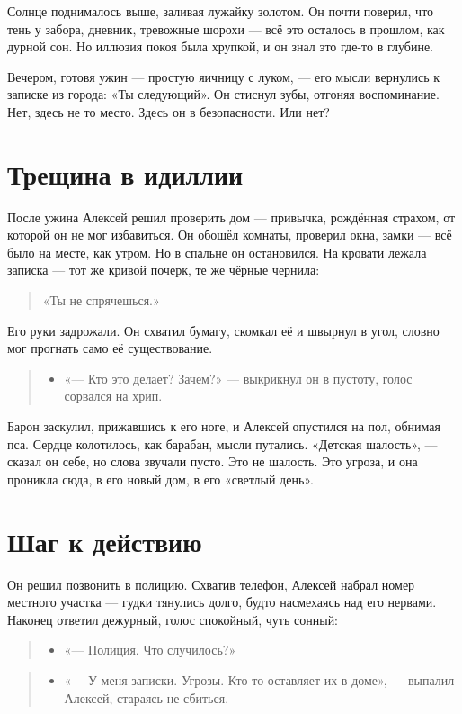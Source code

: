 \documentclass[12pt,a4paper]{book}
\newenvironment{dialogue}{\begin{quote}\itshape\begin{itemize}\item[]}{\end{itemize}\end{quote}}
\begin{document}
Солнце поднималось выше, заливая лужайку золотом. Он почти поверил, что тень у забора, дневник, тревожные шорохи — всё это осталось в прошлом, как дурной сон. Но иллюзия покоя была хрупкой, и он знал это где-то в глубине.

Вечером, готовя ужин — простую яичницу с луком, — его мысли вернулись к записке из города: «Ты следующий». Он стиснул зубы, отгоняя воспоминание. Нет, здесь не то место. Здесь он в безопасности. Или нет?

\section{Трещина в идиллии}

После ужина Алексей решил проверить дом — привычка, рождённая страхом, от которой он не мог избавиться. Он обошёл комнаты, проверил окна, замки — всё было на месте, как утром. Но в спальне он остановился. На кровати лежала записка — тот же кривой почерк, те же чёрные чернила: 

\begin{quote}
«Ты не спрячешься.»
\end{quote}

Его руки задрожали. Он схватил бумагу, скомкал её и швырнул в угол, словно мог прогнать само её существование. 

\begin{dialogue}
«— Кто это делает? Зачем?» — выкрикнул он в пустоту, голос сорвался на хрип.
\end{dialogue}

Барон заскулил, прижавшись к его ноге, и Алексей опустился на пол, обнимая пса. Сердце колотилось, как барабан, мысли путались. «Детская шалость», — сказал он себе, но слова звучали пусто. Это не шалость. Это угроза, и она проникла сюда, в его новый дом, в его «светлый день».

\section{Шаг к действию}

Он решил позвонить в полицию. Схватив телефон, Алексей набрал номер местного участка — гудки тянулись долго, будто насмехаясь над его нервами. Наконец ответил дежурный, голос спокойный, чуть сонный:

\begin{dialogue}
«— Полиция. Что случилось?»
\end{dialogue}

\begin{dialogue}
«— У меня записки. Угрозы. Кто-то оставляет их в доме», — выпалил Алексей, стараясь не сбиться.
\end{dialogue}
\end{document}
